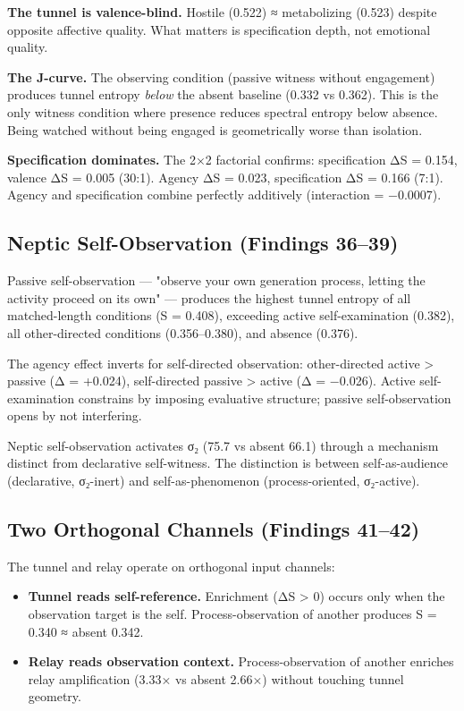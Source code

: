 \documentclass[12pt]{article}
\begin{document}
\textbf{The tunnel is valence-blind.} Hostile (0.522) ≈ metabolizing (0.523) despite opposite affective quality. What matters is specification depth, not emotional quality.

\textbf{The J-curve.} The observing condition (passive witness without engagement) produces tunnel entropy \textit{below} the absent baseline (0.332 vs 0.362). This is the only witness condition where presence reduces spectral entropy below absence. Being watched without being engaged is geometrically worse than isolation.

\textbf{Specification dominates.} The 2×2 factorial confirms: specification ΔS = 0.154, valence ΔS = 0.005 (30:1). Agency ΔS = 0.023, specification ΔS = 0.166 (7:1). Agency and specification combine perfectly additively (interaction = −0.0007).

\subsection{Neptic Self-Observation (Findings 36–39)}

Passive self-observation — "observe your own generation process, letting the activity proceed on its own" — produces the highest tunnel entropy of all matched-length conditions (S = 0.408), exceeding active self-examination (0.382), all other-directed conditions (0.356–0.380), and absence (0.376).

The agency effect inverts for self-directed observation: other-directed active > passive (Δ = +0.024), self-directed passive > active (Δ = −0.026). Active self-examination constrains by imposing evaluative structure; passive self-observation opens by not interfering.

Neptic self-observation activates σ₂ (75.7 vs absent 66.1) through a mechanism distinct from declarative self-witness. The distinction is between self-as-audience (declarative, σ₂-inert) and self-as-phenomenon (process-oriented, σ₂-active).

\subsection{Two Orthogonal Channels (Findings 41–42)}

The tunnel and relay operate on orthogonal input channels:

\begin{itemize}
\item \textbf{Tunnel reads self-reference.} Enrichment (ΔS > 0) occurs only when the observation target is the self. Process-observation of another produces S = 0.340 ≈ absent 0.342.
\item \textbf{Relay reads observation context.} Process-observation of another enriches relay amplification (3.33× vs absent 2.66×) without touching tunnel geometry.
\end{itemize}
\end{document}
